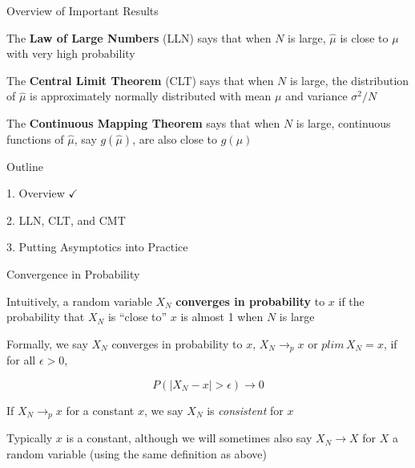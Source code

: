 \documentclass[11pt,english,handout]{beamer}
\newenvironment{wideitemize}{\itemize\addtolength{\itemsep}{10pt}}{\enditemize}
\begin{document}
\begin{frame}{Overview of Important Results}
	
\begin{wideitemize}

\item The \textbf{Law of Large Numbers} (LLN) says that when $N$ is large, $\hat\mu$ is close to $\mu$ with very high probability

\pause
\item The \textbf{Central Limit Theorem} (CLT) says that when $N$ is large, the distribution of $\hat\mu$ is approximately normally distributed with mean $\mu$ and variance $\sigma^2/N$

\pause
\item The \textbf{Continuous Mapping Theorem} says that when $N$ is large, continuous functions of $\hat\mu$, say $g(\hat\mu)$, are also close to $g(\mu)$


\end{wideitemize}	
\end{frame}


\begin{frame}{Outline}

\textcolor{red!75!green!50!blue!25!gray}{1. Overview} $\checkmark$
\vspace{0.8cm}

2. LLN, CLT, and CMT
\vspace{0.8cm}

\textcolor{red!75!green!50!blue!25!gray}{3. Putting Asymptotics into Practice}

\end{frame}


\begin{frame}{Convergence in Probability}
	
\begin{wideitemize}
\item
Intuitively, a random variable $X_N$ \textbf{converges in probability} to $x$ if the probability that $X_N$ is ``close to'' $x$ is almost 1 when $N$ is large

\pause
\item
Formally, we say $X_N$ converges in probability to $x$,  $X_N \rightarrow_p x$ or $plim \, X_N =x $, if for all $\epsilon > 0$, 

$$P(|X_N - x| > \epsilon) \rightarrow 0 $$

\pause
\item 
If $X_N \rightarrow_p x$ for a constant $x$, we say $X_N$ is \textit{consistent} for $x$

\pause
\item
Typically $x$ is a constant, although we will sometimes also say $X_N \rightarrow X$ for $X$ a random variable (using the same definition as above)
	
\end{wideitemize}

\end{frame}
\end{document}
